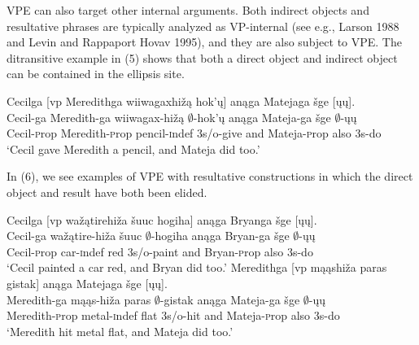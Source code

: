 \documentclass[output=paper]{LSP/langsci}
\begin{document}
VPE can also target other internal arguments. Both indirect objects and resultative phrases are typically analyzed as VP-internal (see e.g., Larson 1988 and Levin and Rappaport Hovav 1995), and they are also subject to VPE. The ditransitive example in (5) shows that both a direct object and indirect object can be contained in the ellipsis site.


\begin{exe}
\ex
\glll Cecilga {\textsc [vp} Meredithga wiiwagaxhi\v{z}\k{a} hok'\k{u}{\textsc ]} an\k{a}ga Matejaga \v{s}ge {\textsc [}\k{u}\k{u}{\textsc ]}.\\
Cecil-ga {} Meredith-ga wiiwagax-hi\v{z}\k{a} $\emptyset$-hok'\k{u} an\k{a}ga Mateja-ga \v{s}ge $\emptyset$-\k{u}\k{u}\\
Cecil-{\textsc prop} {} Meredith-{\textsc prop} pencil-{\textsc indef} {\textsc 3s/o}-give and Mateja-{\textsc prop} also {\textsc 3s}-do\\
\trans `Cecil gave Meredith a pencil, and Mateja did too.'
\end{exe}

In (6), we see examples of VPE with resultative constructions in which the direct object and result have both been elided. 

\begin{exe}
\ex
\begin{xlist}
\ex
\glll Cecilga  {\textsc [vp} wa\v{z}\k{a}tirehi\v{z}a \v{s}uuc hogiha{\textsc ]} an\k{a}ga Bryanga \v{s}ge {\textsc [}\k{u}\k{u}{\textsc ]}.\\
Cecil-ga {} wa\v{z}\k{a}tire-hi\v{z}a \v{s}uuc $\emptyset$-hogiha an\k{a}ga Bryan-ga \v{s}ge $\emptyset$-\k{u}\k{u}\\
Cecil-{\textsc prop} {} car-{\textsc indef} red {\textsc 3s/o}-paint and Bryan-{\textsc prop} also {\textsc 3s}-do\\
\trans `Cecil painted a car red, and Bryan did too.'
\ex
\glll Meredithga  {\textsc [vp} m\k{a}\k{a}shi\v{z}a paras gistak{\textsc ]} an\k{a}ga Matejaga \v{s}ge {\textsc [}\k{u}\k{u}{\textsc ]}.\\
Meredith-ga {} m\k{a}\k{a}s-hi\v{z}a paras $\emptyset$-gistak an\k{a}ga Mateja-ga \v{s}ge $\emptyset$-\k{u}\k{u}\\
Meredith-{\textsc prop} {} metal-{\textsc indef} flat {\textsc 3s/o}-hit and Mateja-{\textsc prop} also {\textsc 3s}-do\\
\trans `Meredith hit metal flat, and Mateja did too.'
\end{xlist}
\end{exe}
\end{document}
